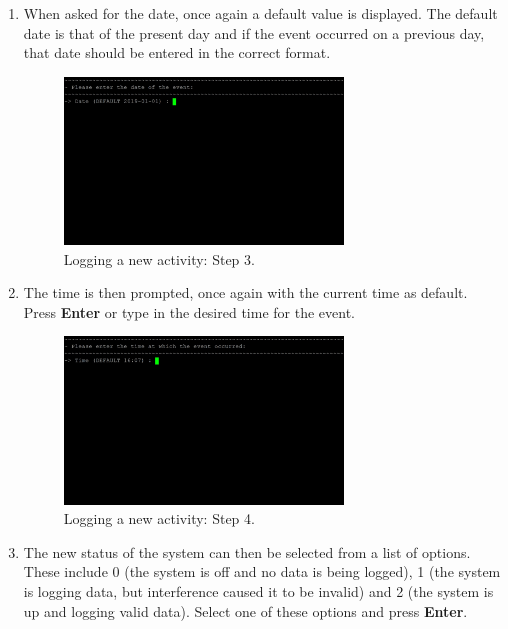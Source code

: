 \begin{enumerate}
\begin{figure}[H]
			\label{fig:ops_log2}
		\end{figure}
	\item When asked for the date, once again a default value is displayed. The default date is that of the present day and if the event occurred on a previous day, that date should be entered in the correct format.
		\begin{figure}[H]
			\centering
			\includegraphics[width=0.7\textwidth]{images/operations/logger_3.jpg}
			\caption{Logging a new activity: Step 3.}
			\label{fig:ops_log3}
		\end{figure}
	\newpage
	\item The time is then prompted, once again with the current time as default. Press \textbf{Enter} or type in the desired time for the event.
		\begin{figure}[H]
			\centering
			\includegraphics[width=0.7\textwidth]{images/operations/logger_4.jpg}
			\caption{Logging a new activity: Step 4.}
			\label{fig:ops_log4}
		\end{figure}
	\item The new status of the system can then be selected from a list of options. These include 0 (the system is off and no data is being logged), 1 (the system is logging data, but interference caused it to be invalid) and 2 (the system is up and logging valid data). Select one of these options and press \textbf{Enter}.
		\begin{figure}[H]

\end{figure}
\end{enumerate}
